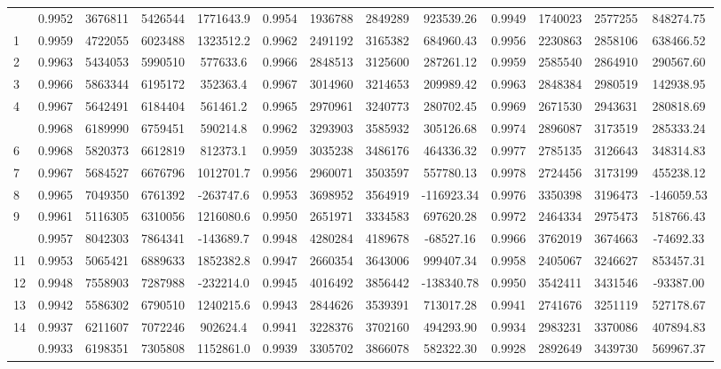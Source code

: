 \documentclass[
  12pt,
]{article}
\begin{document}
\begin{longtable}[t]{lcccccccccccc}
\endfoot
\bottomrule
\endlastfoot
0 & 0.9952 & 3676811 & 5426544 & 1771643.9 & 0.9954 & 1936788 & 2849289 & 923539.26 & 0.9949 & 1740023 & 2577255 & 848274.75\\
1 & 0.9959 & 4722055 & 6023488 & 1323512.2 & 0.9962 & 2491192 & 3165382 & 684960.43 & 0.9956 & 2230863 & 2858106 & 638466.52\\
2 & 0.9963 & 5434053 & 5990510 & 577633.6 & 0.9966 & 2848513 & 3125600 & 287261.12 & 0.9959 & 2585540 & 2864910 & 290567.60\\
3 & 0.9966 & 5863344 & 6195172 & 352363.4 & 0.9967 & 3014960 & 3214653 & 209989.42 & 0.9963 & 2848384 & 2980519 & 142938.95\\
4 & 0.9967 & 5642491 & 6184404 & 561461.2 & 0.9965 & 2970961 & 3240773 & 280702.45 & 0.9969 & 2671530 & 2943631 & 280818.69\\
\addlinespace
5 & 0.9968 & 6189990 & 6759451 & 590214.8 & 0.9962 & 3293903 & 3585932 & 305126.68 & 0.9974 & 2896087 & 3173519 & 285333.24\\
6 & 0.9968 & 5820373 & 6612819 & 812373.1 & 0.9959 & 3035238 & 3486176 & 464336.32 & 0.9977 & 2785135 & 3126643 & 348314.83\\
7 & 0.9967 & 5684527 & 6676796 & 1012701.7 & 0.9956 & 2960071 & 3503597 & 557780.13 & 0.9978 & 2724456 & 3173199 & 455238.12\\
8 & 0.9965 & 7049350 & 6761392 & -263747.6 & 0.9953 & 3698952 & 3564919 & -116923.34 & 0.9976 & 3350398 & 3196473 & -146059.53\\
9 & 0.9961 & 5116305 & 6310056 & 1216080.6 & 0.9950 & 2651971 & 3334583 & 697620.28 & 0.9972 & 2464334 & 2975473 & 518766.43\\
\addlinespace
10 & 0.9957 & 8042303 & 7864341 & -143689.7 & 0.9948 & 4280284 & 4189678 & -68527.16 & 0.9966 & 3762019 & 3674663 & -74692.33\\
11 & 0.9953 & 5065421 & 6889633 & 1852382.8 & 0.9947 & 2660354 & 3643006 & 999407.34 & 0.9958 & 2405067 & 3246627 & 853457.31\\
12 & 0.9948 & 7558903 & 7287988 & -232214.0 & 0.9945 & 4016492 & 3856442 & -138340.78 & 0.9950 & 3542411 & 3431546 & -93387.00\\
13 & 0.9942 & 5586302 & 6790510 & 1240215.6 & 0.9943 & 2844626 & 3539391 & 713017.28 & 0.9941 & 2741676 & 3251119 & 527178.67\\
14 & 0.9937 & 6211607 & 7072246 & 902624.4 & 0.9941 & 3228376 & 3702160 & 494293.90 & 0.9934 & 2983231 & 3370086 & 407894.83\\
\addlinespace
15 & 0.9933 & 6198351 & 7305808 & 1152861.0 & 0.9939 & 3305702 & 3866078 & 582322.30 & 0.9928 & 2892649 & 3439730 & 569967.37\\

\end{longtable}
\end{document}
